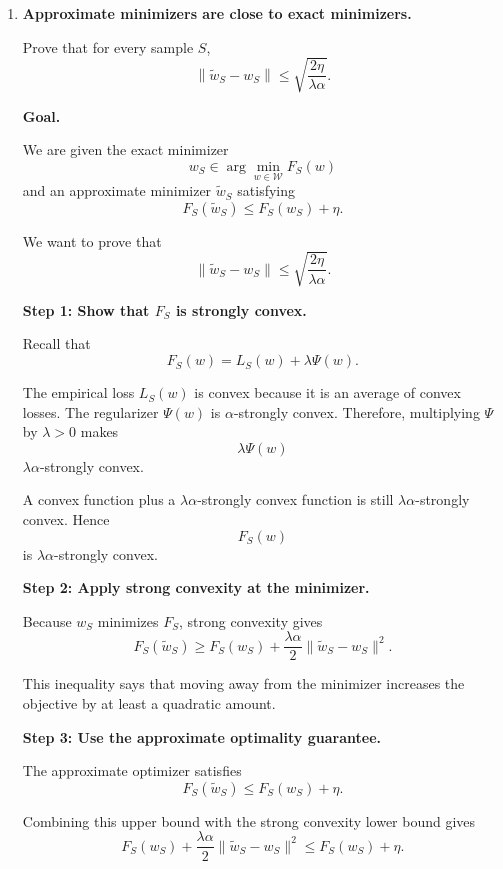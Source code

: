 \documentclass[11pt]{article}
\newcommand{\norm}[1]{\left\lVert #1 \right\rVert}
\begin{document}
\begin{enumerate}

\item \textbf{Approximate minimizers are close to exact minimizers.}

Prove that for every sample $S$,
\[
\norm{\widetilde w_S-w_S}\le\sqrt{\frac{2\eta}{\lambda\alpha}}.
\]

\begin{solutionbox}

\textbf{Goal.}

We are given the exact minimizer
\[
w_S
\in
\arg\min_{w\in\mathcal W} F_S(w)
\]
and an approximate minimizer \(\widetilde w_S\) satisfying
\[
F_S(\widetilde w_S)
\le
F_S(w_S)+\eta.
\]

We want to prove that
\[
\|\widetilde w_S-w_S\|
\le
\sqrt{\frac{2\eta}{\lambda\alpha}}.
\]

\medskip

\textbf{Step 1: Show that \(F_S\) is strongly convex.}

Recall that
\[
F_S(w)
=
L_S(w)+\lambda\Psi(w).
\]

The empirical loss \(L_S(w)\) is convex because it is an average of convex losses. The regularizer \(\Psi(w)\) is \(\alpha\)-strongly convex. Therefore, multiplying \(\Psi\) by \(\lambda>0\) makes
\[
\lambda\Psi(w)
\]
\(\lambda\alpha\)-strongly convex.

A convex function plus a \(\lambda\alpha\)-strongly convex function is still \(\lambda\alpha\)-strongly convex. Hence
\[
F_S(w)
\]
is \(\lambda\alpha\)-strongly convex.

\medskip

\textbf{Step 2: Apply strong convexity at the minimizer.}

Because \(w_S\) minimizes \(F_S\), strong convexity gives
\[
F_S(\widetilde w_S)
\ge
F_S(w_S)
+
\frac{\lambda\alpha}{2}
\|\widetilde w_S-w_S\|^2.
\]

This inequality says that moving away from the minimizer increases the objective by at least a quadratic amount.

\medskip

\textbf{Step 3: Use the approximate optimality guarantee.}

The approximate optimizer satisfies
\[
F_S(\widetilde w_S)
\le
F_S(w_S)+\eta.
\]

Combining this upper bound with the strong convexity lower bound gives
\[
F_S(w_S)
+
\frac{\lambda\alpha}{2}
\|\widetilde w_S-w_S\|^2
\le
F_S(w_S)+\eta.
\]


\end{solutionbox}
\end{enumerate}
\end{document}
